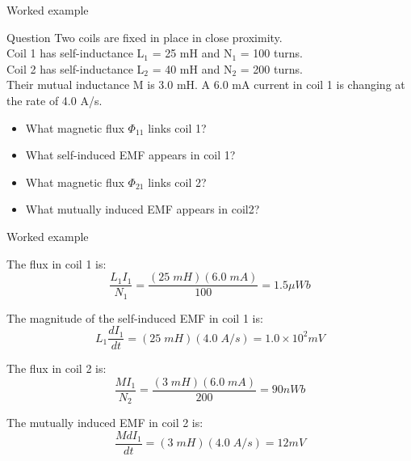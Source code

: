 {
\problemslide

\begin{frame}{Worked example}

\begin{blockexmplque}{Question}
  Two coils are fixed in place in close proximity.\\
  Coil 1 has self-inductance L$_{1}$ = 25 mH and N$_{1}$ = 100 turns.\\
  Coil 2 has self-inductance L$_{2}$ = 40 mH and N$_{2}$ = 200 turns.\\
  Their mutual inductance M is 3.0 mH.
  A 6.0 mA current in coil 1 is changing at the rate of 4.0 A/s.
  \begin{itemize}
   \item What magnetic flux $\Phi_{11}$ links coil 1?
   \item What self-induced EMF appears in coil 1?
   \item What magnetic flux $\Phi_{21}$ links coil 2?
   \item What mutually induced EMF appears in coil2?
  \end{itemize}
\end{blockexmplque}

\end{frame}

%
%
%
%

\begin{frame}{Worked example}

  The flux in coil 1 is:
  \begin{equation*}
    \frac{L_1 I_1}{N_1} = \frac{(25 \; mH)(6.0 \; mA)}{100} = 1.5  {\mu}Wb
  \end{equation*}

  The magnitude of the self-induced EMF in coil 1 is:
  \begin{equation*}
    L_1 \frac{dI_1}{dt} = (25 \; mH) (4.0 \; A/s) = 1.0 \times 10^2 mV
  \end{equation*}

  The flux in coil 2 is:
  \begin{equation*}
    \frac{M I_1}{N_2} = \frac{(3 \; mH)(6.0 \; mA)}{200} = 90 nWb
  \end{equation*}

  The mutually induced EMF in coil 2 is:
  \begin{equation*}
    \frac{M dI_1}{dt} = (3 \; mH)(4.0 \; A/s)= 12 mV
  \end{equation*}

\end{frame}

} %

